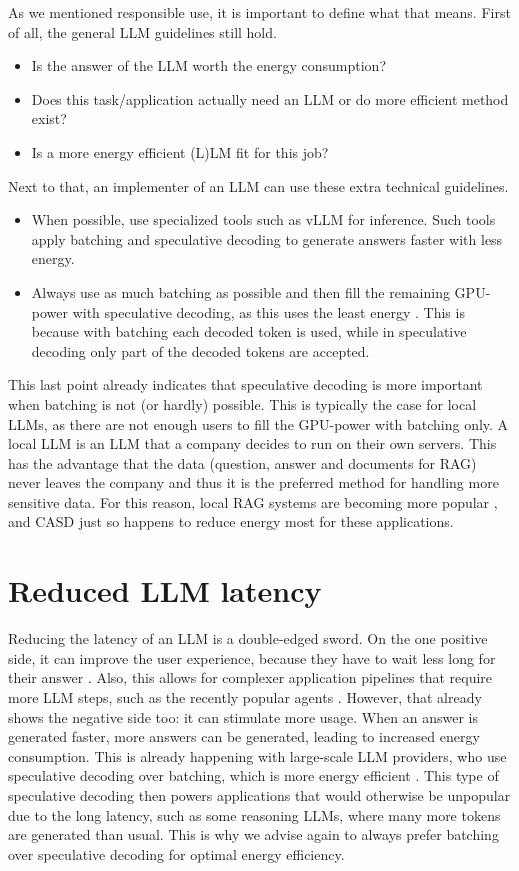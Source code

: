 As we mentioned responsible use, it is important to define what that means. First of all, the general LLM guidelines still hold.
\begin{itemize}
    \item Is the answer of the LLM worth the energy consumption?
    \item Does this task/application actually need an LLM or do more efficient method exist?
    \item Is a more energy efficient (L)LM fit for this job?
\end{itemize}
Next to that, an implementer of an LLM can use these extra technical guidelines.
\begin{itemize}
    \item When possible, use specialized tools such as vLLM \cite{kwon2023efficient} for inference. Such tools apply batching and speculative decoding to generate answers faster with less energy.
    \item Always use as much batching as possible and then fill the remaining GPU-power with speculative decoding, as this uses the least energy \cite{fernandez2025energy}. This is because with batching each decoded token is used, while in speculative decoding only part of the decoded tokens are accepted.
\end{itemize}
This last point already indicates that speculative decoding is more important when batching is not (or hardly) possible. This is typically the case for local LLMs, as there are not enough users to fill the GPU-power with batching only. A local LLM is an LLM that a company decides to run on their own servers. This has the advantage that the data (question, answer and documents for RAG) never leaves the company and thus it is the preferred method for handling more sensitive data. For this reason, local RAG systems are becoming more popular \cite{espin2025rise, k2view2025GenAI, pieces2025local, menlov2025state}, and CASD just so happens to reduce energy most for these applications.

\section{Reduced LLM latency}

Reducing the latency of an LLM is a double-edged sword. On the one positive side, it can improve the user experience, because they have to wait less long for their answer \cite{bamoria2025solving}. Also, this allows for complexer application pipelines that require more LLM steps, such as the recently popular agents \cite{chudleigh2025complete, suard2025quick}. However, that already shows the negative side too: it can stimulate more usage. When an answer is generated faster, more answers can be generated, leading to increased energy consumption. This is already happening with large-scale LLM providers, who use speculative decoding over batching, which is more energy efficient \cite{hassabis2025year, svirschevski2024specexec}. This type of speculative decoding then powers applications that would otherwise be unpopular due to the long latency, such as some reasoning LLMs, where many more tokens are generated than usual. This is why we advise again to always prefer batching over speculative decoding for optimal energy efficiency.

